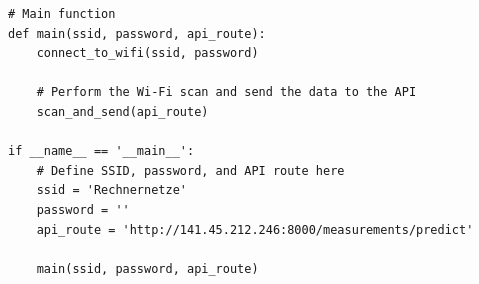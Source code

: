\begin{lstlisting}[caption={\textit{MicroPython}-Quellcode für die Durchführung eines WiFi-Scans und die Raumbestimmung über die API}, label={lst:esp32}]
# Main function
def main(ssid, password, api_route):
    connect_to_wifi(ssid, password)
    
    # Perform the Wi-Fi scan and send the data to the API
    scan_and_send(api_route)

if __name__ == '__main__':
    # Define SSID, password, and API route here
    ssid = 'Rechnernetze'
    password = ''
    api_route = 'http://141.45.212.246:8000/measurements/predict'
    
    main(ssid, password, api_route)
\end{lstlisting}    

